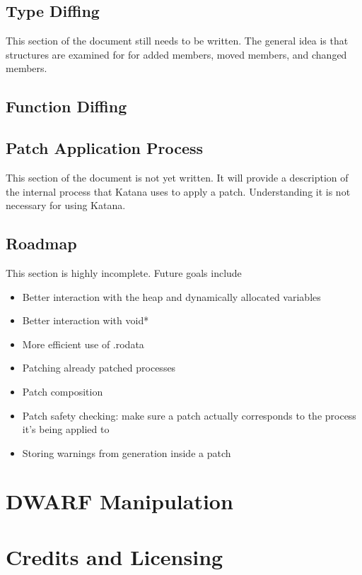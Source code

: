 \documentclass[11pt]{article}
\begin{document}
\subsection{Type Diffing}
\label{sec-3.11}

   This section of the document still needs to be written. The general
   idea is that structures are examined for for added members, moved
   members, and changed members.
\subsection{Function Diffing}
\label{sec-3.12}

\subsection{Patch Application Process}
\label{sec-3.13}

   This section of the document is not yet written. It will provide a
   description of the internal process that Katana uses to apply a
   patch. Understanding it is not necessary for using Katana.
\subsection{Roadmap}
\label{sec-3.14}

   This section is highly incomplete. Future goals include
\begin{itemize}
\item Better interaction with the heap and dynamically allocated variables
\item Better interaction with void*
\item More efficient use of .rodata
\item Patching already patched processes
\item Patch composition
\item Patch safety checking: make sure a patch actually corresponds to
     the process it's being applied to
\item Storing warnings from generation inside a patch
\end{itemize}
\section{DWARF Manipulation}
\label{sec-4}

\section{Credits and Licensing}
\label{sec-5}
\end{document}
